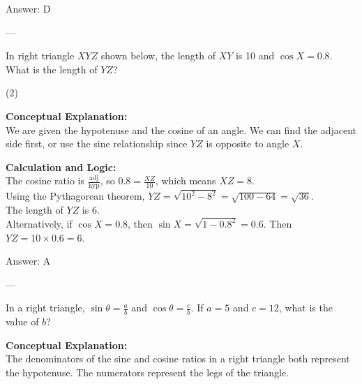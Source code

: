 \documentclass[11pt,paper=a4,answers]{exam}
\begin{document}
\begin{questions}
\begin{solution}
\vspace{15pt}
Answer: \colorbox{yellow!100}{D}
\end{solution}

---

\question
In right triangle $XYZ$ shown below, the length of $XY$ is 10 and $\cos X = 0.8$. What is the length of $YZ$?
\begin{center}
\end{center}
\begin{tasks}(2)
\end{tasks}

\begin{solution}
\textbf{Conceptual Explanation:} \\
We are given the hypotenuse and the cosine of an angle. We can find the adjacent side first, or use the sine relationship since $YZ$ is opposite to angle $X$.

\vspace{10pt}
\textbf{Calculation and Logic:} \\
The cosine ratio is $\frac{\text{adj}}{\text{hyp}}$, so $0.8 = \frac{XZ}{10}$, which means $XZ = 8$. \\
Using the Pythagorean theorem, $YZ = \sqrt{10^2 - 8^2} = \sqrt{100 - 64} = \sqrt{36}$. \\
The length of $YZ$ is 6. \\
Alternatively, if $\cos X = 0.8$, then $\sin X = \sqrt{1 - 0.8^2} = 0.6$. Then $YZ = 10 \times 0.6 = 6$.

\vspace{15pt}
Answer: \colorbox{yellow!100}{A}
\end{solution}

---

\question
In a right triangle, $\sin \theta = \frac{a}{b}$ and $\cos \theta = \frac{c}{b}$. If $a=5$ and $c=12$, what is the value of $b$?

\begin{solution}
\textbf{Conceptual Explanation:} \\
The denominators of the sine and cosine ratios in a right triangle both represent the hypotenuse. The numerators represent the legs of the triangle.


\end{solution}
\end{questions}
\end{document}
